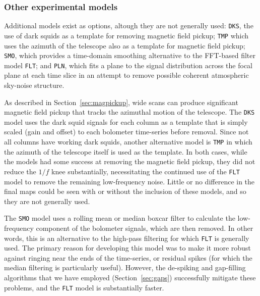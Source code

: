 \documentclass[useAMS,usenatbib,nofootinbib]{mn2e}
\newcommand{\model}[1]{\texttt{#1}}
\begin{document}
\subsubsection{Other experimental models}

Additional models exist as options, altough they are not generally
used: \model{DKS}, the use of dark squids as a template for removing
magnetic field pickup; \model{TMP} which uses the azimuth of the
telescope also as a template for magnetic field pickup; \model{SMO},
which provides a time-domain smoothing alternative to the FFT-based
filter model \model{FLT}; and \model{PLN}, which fits a plane to the
signal distribution across the focal plane at each time slice in an
attempt to remove possible coherent atmospheric sky-noise structure.

As described in Section~\ref{sec:magpickup}, wide scans can produce
significant magnetic field pickup that tracks the azimuthal motion of
the telescope. The \model{DKS} model uses the dark squid signals for
each column as a template that is simply scaled (gain and offset) to
each bolometer time-series before removal. Since not all columns have
working dark squids, another alternative model is \model{TMP} in which
the azimuth of the telescope itself is used as the template. In both
cases, while the models had some success at removing the magnetic
field pickup, they did not reduce the $1/f$ knee substantially,
necessitating the continued use of the \model{FLT} model to remove the
remaining low-frequency noise. Little or no difference in the final
maps could be seen with or without the inclusion of these models, and
so they are not generally used.

The \model{SMO} model uses a rolling mean or median boxcar filter to
calculate the low-frequency component of the bolometer signals, which
are then removed. In other words, this is an alternative to the
high-pass filtering for which \model{FLT} is generally used. The
primary reason for developing this model was to make it more robust
against ringing near the ends of the time-series, or residual spikes
(for which the median filtering is particularly useful). However, the
de-spiking and gap-filling algorithms that we have employed
(Section~\ref{sec:gaps}) successfully mitigate these problems, and the
\model{FLT} model is substantially faster.
\end{document}
